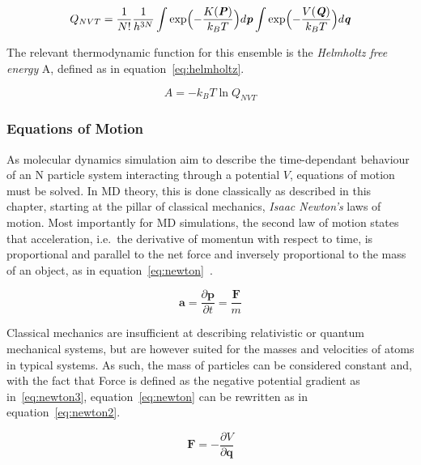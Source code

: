 \documentclass[11pt]{article}
\begin{document}
\begin{equation}
  Q_{NVT} = \frac{1}{N!}\frac{1}{h^{3N}}\int \exp\Bigl(-\frac{K(\textbf{\textit{P}})}{k_BT}\Bigl)d\textbf{\textit{p}}\int \exp\Bigl(-\frac{V(\textbf{\textit{Q}})}{k_BT}\Bigl)d\textbf{\textit{q}}
  \label{eq:partition2}
\end{equation}

\bigskip

\noindent The relevant thermodynamic function for this ensemble is the \textit{Helmholtz free energy} A, defined as in equation~\ref{eq:helmholtz}.

\begin{equation}
  A=-k_BT \ln Q_{NVT}
  \label{eq:helmholtz}
\end{equation}

\bigskip

\subsubsection{Equations of Motion}
As molecular dynamics simulation aim to describe the time-dependant behaviour of an N particle system interacting through a potential $V$, equations of motion must be solved. In MD theory, this is done classically as described in this chapter, starting at the pillar of classical mechanics, \textit{Isaac Newton's} laws of motion. Most importantly for MD simulations, the second law of motion states that acceleration, i.e.~the derivative of momentun with respect to time, is proportional and parallel to the net force and inversely proportional to the mass of an object, as in equation~\ref{eq:newton}~\cite{Alrasheed2019}.

\begin{equation}
  \textbf{a} = \frac{\partial\textbf{p}}{\partial t} = \frac{\textbf{F}}{m}
  \label{eq:newton}
\end{equation}

\bigskip

\noindent Classical mechanics are insufficient at describing relativistic or quantum mechanical systems, but are however suited for the masses and velocities of atoms in typical systems.  As such, the mass of particles can be considered constant and, with the fact that Force is defined as the negative potential gradient as in~\ref{eq:newton3}, equation~\ref{eq:newton} can be rewritten as in equation~\ref{eq:newton2}.

\begin{equation}
  \textbf{F} = -\frac{\partial V}{\partial\textbf{q}}
  \label{eq:newton3}
\end{equation}
\end{document}
